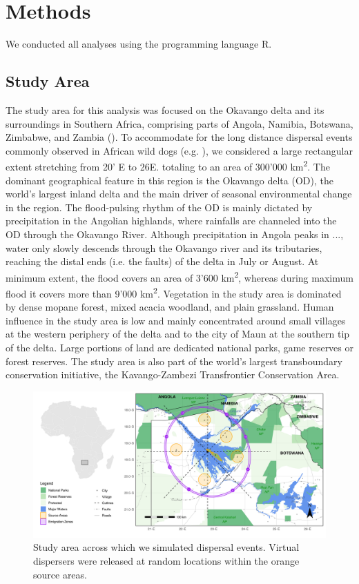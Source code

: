\documentclass[abstract=on,10pt,a4paper,bibliography=totocnumbered]{article}
\begin{document}
\section{Methods}
We conducted all analyses using the programming language R.

\subsection{Study Area}
The study area for this analysis was focused on the Okavango delta and its
surroundings in Southern Africa, comprising parts of Angola, Namibia, Botswana,
Zimbabwe, and Zambia (). To accommodate for the long distance
dispersal events commonly observed in African wild dogs (e.g.
\citep{DaviesMostert.2012, Masenga.2016, Cozzi.2020}), we considered a large
rectangular extent stretching from 20' E to 26\degree E. totaling to
an area of 300'000 km\textsuperscript{2}. The dominant geographical feature in
this region is the Okavango delta (OD), the world's largest inland delta and the
main driver of seasonal environmental change in the region. The flood-pulsing
rhythm of the OD is mainly dictated by precipitation in the Angolian highlands,
where rainfalls are channeled into the OD through the Okavango River. Although
precipitation in Angola peaks in ..., water only slowly descends through the
Okavango river and its tributaries, reaching the distal ends (i.e. the faults)
of the delta in July or August. At minimum extent, the flood covers an area of
3'600 km\textsuperscript{2}, whereas during maximum flood it covers more than
9'000 km\textsuperscript{2}. Vegetation in the study area is dominated by dense
mopane forest, mixed acacia woodland, and plain grassland. Human influence in
the study area is low and mainly concentrated around small villages at the
western periphery of the delta and to the city of Maun at the southern tip of
the delta. Large portions of land are dedicated national parks, game reserves or
forest reserves. The study area is also part of the world's largest
transboundary conservation initiative, the Kavango-Zambezi Transfrontier
Conservation Area.

\begin{figure}
  \begin{center}
  \includegraphics[width = \textwidth]{99_StudyArea.png}
  \caption{Study area across which we simulated dispersal events. Virtual
  dispersers were released at random locations within the orange source areas.}
  \label{StudyArea}
  \end{center}
\end{figure}
\end{document}
